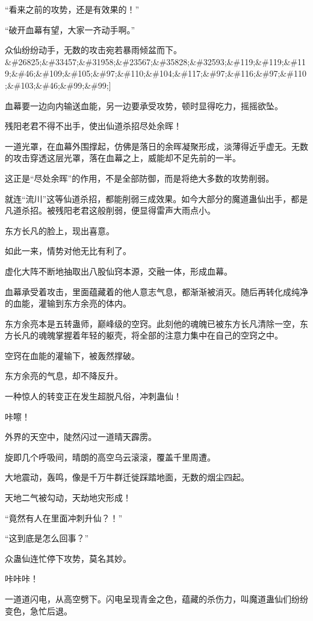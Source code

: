 \begin{this_body}
“看来之前的攻势，还是有效果的！”

“破开血幕有望，大家一齐动手啊。”

众仙纷纷动手，无数的攻击宛若暴雨倾盆而下。\&\#26825;\&\#33457;\&\#31958;\&\#23567;\&\#35828;\&\#32593;\&\#119;\&\#119;\&\#119;\&\#46;\&\#109;\&\#105;\&\#97;\&\#110;\&\#104;\&\#117;\&\#97;\&\#116;\&\#97;\&\#110;\&\#103;\&\#46;\&\#99;\&\#99;]

血幕要一边向内输送血能，另一边要承受攻势，顿时显得吃力，摇摇欲坠。

残阳老君不得不出手，使出仙道杀招尽处余晖！

一道光罩，在血幕外围撑起，仿佛是落日的余晖凝聚形成，淡薄得近乎虚无。无数的攻击穿透这层光罩，落在血幕之上，威能却不足先前的一半。

这正是“尽处余晖”的作用，不是全部防御，而是将绝大多数的攻势削弱。

就连“流川”这等仙道杀招，都能削弱三成效果。如今大部分的魔道蛊仙出手，都是凡道杀招。被残阳老君这般削弱，便显得雷声大雨点小。

东方长凡的脸上，现出喜意。

如此一来，情势对他无比有利了。

虚化大阵不断地抽取出八股仙窍本源，交融一体，形成血幕。

血幕承受着攻击，里面蕴藏着的他人意志气息，都渐渐被消灭。随后再转化成纯净的血能，灌输到东方余亮的体内。

东方余亮本是五转蛊师，巅峰级的空窍。此刻他的魂魄已被东方长凡清除一空，东方长凡的魂魄掌握着年轻的躯壳，将全部的注意力集中在自己的空窍之中。

空窍在血能的灌输下，被轰然撑破。

东方余亮的气息，却不降反升。

一种惊人的转变正在发生超脱凡俗，冲刺蛊仙！

咔嚓！

外界的天空中，陡然闪过一道晴天霹雳。

旋即几个呼吸间，晴朗的高空乌云滚滚，覆盖千里周遭。

大地震动，轰鸣，像是千万牛群迁徙踩踏地面，无数的烟尘四起。

天地二气被勾动，天劫地灾形成！

“竟然有人在里面冲刺升仙？！”

“这到底是怎么回事？”

众蛊仙连忙停下攻势，莫名其妙。

咔咔咔！

一道道闪电，从高空劈下。闪电呈现青金之色，蕴藏的杀伤力，叫魔道蛊仙们纷纷变色，急忙后退。


\end{this_body}
